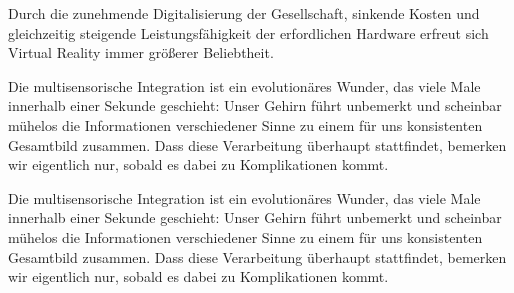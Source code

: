 Durch die zunehmende Digitalisierung der Gesellschaft, sinkende Kosten und gleichzeitig steigende Leistungsf\"ahigkeit der erfordlichen Hardware erfreut sich Virtual Reality immer gr\"oßerer Beliebtheit.

Die multisensorische Integration ist ein evolution\"ares Wunder, das viele Male innerhalb einer Sekunde geschieht: 
Unser Gehirn f\"uhrt unbemerkt und scheinbar m\"uhelos die Informationen verschiedener Sinne zu einem f\"ur uns konsistenten Gesamtbild zusammen. 
Dass diese Verarbeitung \"uberhaupt stattfindet, bemerken wir eigentlich nur, sobald es dabei zu Komplikationen kommt.

Die multisensorische Integration ist ein evolution\"ares Wunder, das viele Male innerhalb einer Sekunde geschieht: 
Unser Gehirn f\"uhrt unbemerkt und scheinbar m\"uhelos die Informationen verschiedener Sinne zu einem f\"ur uns konsistenten Gesamtbild zusammen. 
Dass diese Verarbeitung \"uberhaupt stattfindet, bemerken wir eigentlich nur, sobald es dabei zu Komplikationen kommt.


